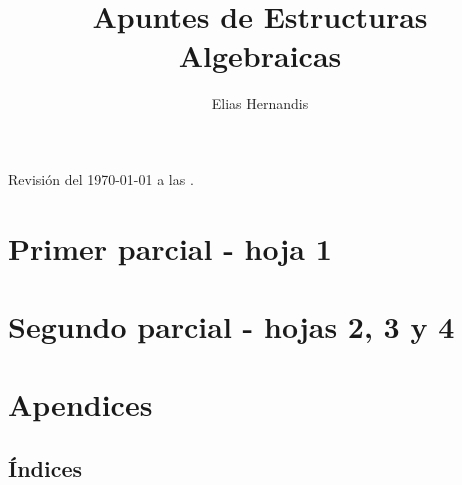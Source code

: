 \documentclass{book}
\title{Apuntes de Estructuras Algebraicas}
\author{Elias Hernandis}
\begin{document}
\maketitle
Revisión del \today $ $ a las \currenttime.

\tableofcontents

\part{Primer parcial - hoja 1}







\part{Segundo parcial - hojas 2, 3 y 4}












\part{Apendices}
\renewcommand{\thechapter}{\Alph{chapter}}
\setcounter{chapter}{0}





\chapter{Índices}

\renewcommand{\listtheoremname}{Lista de definiciones}
\listoftheorems[ignore={thm,ej,pro,cor,obs,lem,ex}]

\renewcommand{\listtheoremname}{Lista de teoremas}
\listoftheorems[onlynamed,ignore={dfn,ej,pro,cor,obs,lem,ex}]

\renewcommand{\listtheoremname}{Lista de ejemplos}
\listoftheorems[onlynamed,ignore={dfn,thm,pro,cor,obs,lem,ex}]

\renewcommand{\listtheoremname}{Lista de ejercicios}
\listoftheorems[onlynamed,ignore={dfn,thm,pro,cor,obs,lem,ej}]




\end{document}
